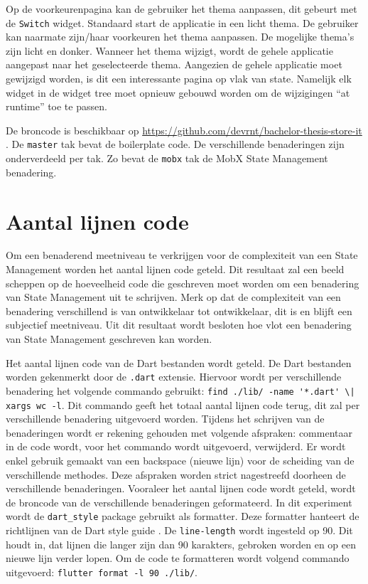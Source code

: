 Op de voorkeurenpagina kan de gebruiker het thema aanpassen, dit gebeurt met de \verb|Switch| widget. Standaard start de applicatie in een licht thema. De gebruiker kan naarmate zijn/haar voorkeuren het thema aanpassen. De mogelijke thema's zijn licht en donker.
Wanneer het thema wijzigt, wordt de gehele applicatie aangepast naar het geselecteerde thema. Aangezien de gehele applicatie moet gewijzigd worden, is dit een interessante pagina op vlak van state. Namelijk elk widget in de widget tree moet opnieuw gebouwd worden om de wijzigingen ``at runtime'' toe te passen.


De broncode is beschikbaar op \url{https://github.com/devrnt/bachelor-thesis-store-it} \autocite{DeVrient2019}. De \verb|master| tak bevat de boilerplate code. De verschillende benaderingen zijn onderverdeeld per tak. Zo bevat de \verb|mobx| tak de MobX State Management benadering.

\section{Aantal lijnen code}
\label{ch:loc}
Om een benaderend meetniveau te verkrijgen voor de complexiteit van een State Management worden het aantal lijnen code geteld. Dit resultaat zal een beeld scheppen op de hoeveelheid code die geschreven moet worden om een benadering van State Management uit te schrijven. Merk op dat de complexiteit van een benadering verschillend is van ontwikkelaar tot ontwikkelaar, dit is en blijft een subjectief meetniveau. Uit dit resultaat wordt besloten hoe vlot een benadering van State Management geschreven kan worden.  

Het aantal lijnen code van de Dart bestanden wordt geteld. De Dart bestanden worden gekenmerkt door de \verb|.dart| extensie. Hiervoor wordt per verschillende benadering het volgende commando gebruikt: \verb=find ./lib/ -name '*.dart' \| xargs wc -l=. Dit commando geeft het totaal aantal lijnen code terug, dit zal per verschillende benadering uitgevoerd worden. \newline 
Tijdens het schrijven van de benaderingen wordt er rekening gehouden met volgende afspraken: commentaar in de code wordt, voor het commando wordt uitgevoerd, verwijderd. Er wordt enkel gebruik gemaakt van een backspace (nieuwe lijn) voor de scheiding van de verschillende methodes. Deze afspraken worden strict nagestreefd doorheen de verschillende benaderingen. \newline
\newline
Vooraleer het aantal lijnen code wordt geteld, wordt de broncode van de verschillende benaderingen geformateerd. In dit experiment wordt de \verb|dart_style| package gebruikt als formatter. Deze formatter hanteert de richtlijnen van de Dart style guide \autocite{Dart2019a}. De \verb|line-length| wordt ingesteld op 90. Dit houdt in, dat lijnen die langer zijn dan 90 karakters, gebroken worden en op een nieuwe lijn verder lopen. Om de code te formatteren wordt volgend commando uitgevoerd: \verb|flutter format -l 90 ./lib/|.


